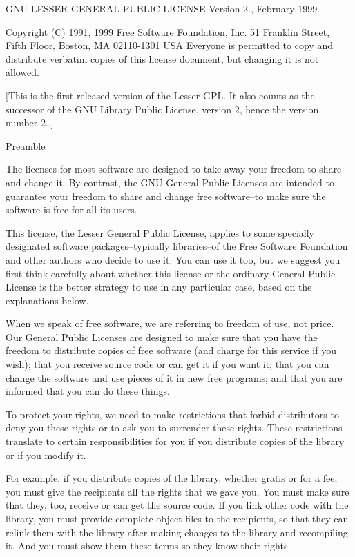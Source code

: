 G\+NU L\+E\+S\+S\+ER G\+E\+N\+E\+R\+AL P\+U\+B\+L\+IC L\+I\+C\+E\+N\+SE Version 2., February 1999

Copyright (C) 1991, 1999 Free Software Foundation, Inc. 51 Franklin Street, Fifth Floor, Boston, MA 02110-\/1301 U\+SA Everyone is permitted to copy and distribute verbatim copies of this license document, but changing it is not allowed.

\mbox{[}This is the first released version of the Lesser G\+PL. It also counts as the successor of the G\+NU Library Public License, version 2, hence the version number 2..\mbox{]} \begin{DoxyVerb}                       Preamble
\end{DoxyVerb}


The licenses for most software are designed to take away your freedom to share and change it. By contrast, the G\+NU General Public Licenses are intended to guarantee your freedom to share and change free software--to make sure the software is free for all its users.

This license, the Lesser General Public License, applies to some specially designated software packages--typically libraries--of the Free Software Foundation and other authors who decide to use it. You can use it too, but we suggest you first think carefully about whether this license or the ordinary General Public License is the better strategy to use in any particular case, based on the explanations below.

When we speak of free software, we are referring to freedom of use, not price. Our General Public Licenses are designed to make sure that you have the freedom to distribute copies of free software (and charge for this service if you wish); that you receive source code or can get it if you want it; that you can change the software and use pieces of it in new free programs; and that you are informed that you can do these things.

To protect your rights, we need to make restrictions that forbid distributors to deny you these rights or to ask you to surrender these rights. These restrictions translate to certain responsibilities for you if you distribute copies of the library or if you modify it.

For example, if you distribute copies of the library, whether gratis or for a fee, you must give the recipients all the rights that we gave you. You must make sure that they, too, receive or can get the source code. If you link other code with the library, you must provide complete object files to the recipients, so that they can relink them with the library after making changes to the library and recompiling it. And you must show them these terms so they know their rights.

